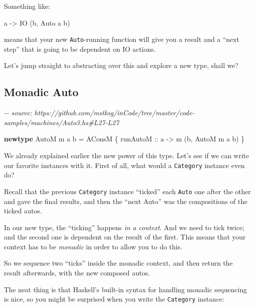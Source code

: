 \documentclass[]{article}
\newenvironment{Shaded}{}{}
\newcommand{\CommentTok}[1]{\textcolor[rgb]{0.38,0.63,0.69}{\textit{#1}}}
\newcommand{\DataTypeTok}[1]{\textcolor[rgb]{0.56,0.13,0.00}{#1}}
\newcommand{\KeywordTok}[1]{\textcolor[rgb]{0.00,0.44,0.13}{\textbf{#1}}}
\newcommand{\NormalTok}[1]{#1}
\newcommand{\OtherTok}[1]{\textcolor[rgb]{0.00,0.44,0.13}{#1}}
\begin{document}
Something like:

\begin{Shaded}
\begin{Highlighting}[]
\NormalTok{a }\OtherTok{{-}>} \DataTypeTok{IO}\NormalTok{ (b, }\DataTypeTok{Auto}\NormalTok{ a b)}
\end{Highlighting}
\end{Shaded}

means that your new \texttt{Auto}-running function will give you a result and a
``next step'' that is going to be dependent on IO actions.

Let's jump straight to abstracting over this and explore a new type, shall we?

\hypertarget{monadic-auto}{%
\subsection{Monadic Auto}\label{monadic-auto}}

\begin{Shaded}
\begin{Highlighting}[]
\CommentTok{{-}{-} source: https://github.com/mstksg/inCode/tree/master/code{-}samples/machines/Auto3.hs\#L27{-}L27}

\KeywordTok{newtype} \DataTypeTok{AutoM}\NormalTok{ m a b }\OtherTok{=} \DataTypeTok{AConsM}\NormalTok{ \{}\OtherTok{ runAutoM ::}\NormalTok{ a }\OtherTok{{-}>}\NormalTok{ m (b, }\DataTypeTok{AutoM}\NormalTok{ m a b) \}}
\end{Highlighting}
\end{Shaded}

We already explained earlier the new power of this type. Let's see if we can
write our favorite instances with it. First of all, what would a
\texttt{Category} instance even do?

Recall that the previous \texttt{Category} instance ``ticked'' each
\texttt{Auto} one after the other and gave the final results, and then the
``next Auto'' was the compositions of the ticked autos.

In our new type, the ``ticking'' happens \emph{in a context}. And we need to
tick twice; and the second one is dependent on the result of the first. This
means that your context has to be \emph{monadic} in order to allow you to do
this.

So we sequence two ``ticks'' inside the monadic context, and then return the
result afterwards, with the new composed autos.

The neat thing is that Haskell's built-in syntax for handling monadic sequencing
is nice, so you might be surprised when you write the \texttt{Category}
instance:
\end{document}
